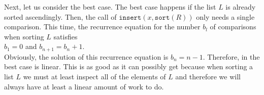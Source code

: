 Next, let us consider the best case.  The best case happens if the list $L$ is already sorted
ascendingly.  Then, the call of 
$\mathtt{insert}(x,\mathtt{sort}(R))$ only needs a single comparison.  This time, the recurrence
equation for the number $b_l$ of comparisons when sorting $L$ satisfies
 \\[0.2cm]
\hspace*{1.3cm}
$b_1 = 0$ \quad and \quad $b_{n+1} = b_n + 1$. 
\\[0.2cm]
Obviously, the solution of this recurrence equation is $b_n = n-1$.  Therefore, in the best case
 is linear.  This is as good as it can possibly get because when sorting a list $L$ we
must at least inspect all of the elements of $L$ and therefore we will always have at least a linear
amount of work to do.


